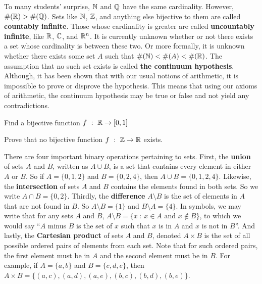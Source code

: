 To many students' surprise, $\mathbb{N}$ and $\mathbb{Q}$ have the same cardinality. However, $\#(\mathbb{R}) > \#(\mathbb{Q})$. Sets like $\mathbb{N}$, $\mathbb{Z}$, and anything else bijective to them are called \textbf{countably infinite}. Those whose cardinality is greater are called \textbf{uncountably infinite}, like $\mathbb{R}$, $\mathbb{C}$, and $\mathbb{R}^n$. It is currently unknown whether or not there exists a set whose cardinality is between these two. Or more formally, it is unknown whether there exists some set $A$ such that $\#(\mathbb{N})<\#(A)<\#(\mathbb{R})$. The assumption that no such set exists is called \textbf{the continuum hypothesis}. Although, it has been shown that with our usual notions of arithmetic, it is impossible to prove or disprove the hypothesis. This means that using our axioms of arithmetic, the continuum hypothesis may be true or false and not yield any contradictions. \\

\begin{exercise}
    Find a bijective function $f\ : \ \mathbb{R} \to [0,1]$
\end{exercise}
\vspace{-5mm}
\begin{exercise}[Challenge]
    Prove that no bijective function $f\ : \ \mathbb{Z} \to \mathbb{R}$ exists.
\end{exercise}

There are four important binary operations pertaining to sets. First, the \textbf{union} of sets $A$ and $B$, written as $A\cup B$, is a set that contains every element in either $A$ or $B$. So if $A=\{0,1,2\}$ and $B=\{0,2,4\}$, then $A\cup B=\{0,1,2,4\}$. Likewise, the \textbf{intersection} of sets $A$ and $B$ contains the elements found in both sets. So we write $A\cap B=\{0,2\}$. Thirdly, the \textbf{difference} $A \setminus B$ is the set of elements in $A$ that are not found in $B$. So $A \setminus B=\{1\}$ and $B \setminus A=\{4\}$. In symbols, we may write that for any sets $A$ and $B$, $A\setminus B=\{x\ :\ x\in A \text{ and } x\notin B\}$, to which we would say ``$A$ minus $B$ is the set of $x$ such that $x$ is in $A$ and $x$ is not in $B$''. And lastly, the \textbf{Cartesian product} of sets $A$ and $B$, denoted $A\times B$ is the set of all possible ordered pairs of elements from each set. Note that for such ordered pairs, the first element must be in $A$ and the second element must be in $B$. For example, if $A=\{a,b\}$ and $B=\{c,d,e\}$, then $A\times B = \{(a,c),(a,d),(a,e),(b,c),(b,d),(b,e)\}$. \\

